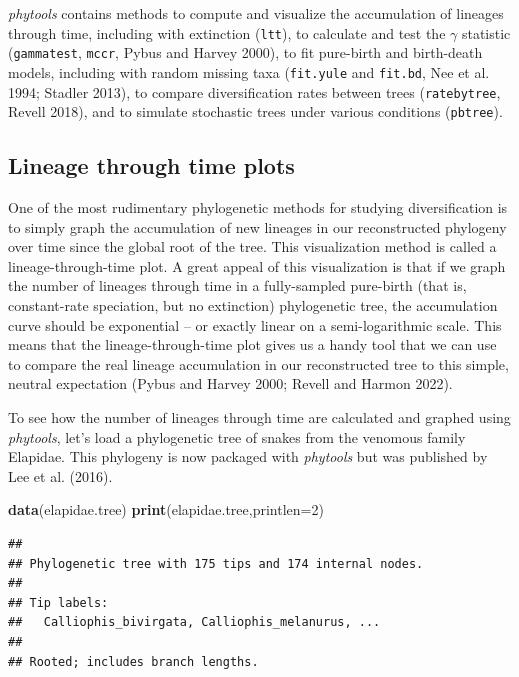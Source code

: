 \documentclass[fleqn,10pt,lineno]{wlpeerj} %
\newenvironment{Shaded}{\begin{snugshade}}{\end{snugshade}}
\newcommand{\AttributeTok}[1]{\textcolor[rgb]{0.13,0.29,0.53}{#1}}
\newcommand{\DecValTok}[1]{\textcolor[rgb]{0.00,0.00,0.81}{#1}}
\newcommand{\FunctionTok}[1]{\textcolor[rgb]{0.13,0.29,0.53}{\textbf{#1}}}
\newcommand{\NormalTok}[1]{#1}
\begin{document}
\emph{phytools} contains methods to compute and visualize the accumulation of lineages through time, including with extinction (\texttt{ltt}), to calculate and test the \(\gamma\) statistic (\texttt{gammatest}, \texttt{mccr}, Pybus and Harvey 2000), to fit pure-birth and birth-death models, including with random missing taxa (\texttt{fit.yule} and \texttt{fit.bd}, Nee et al. 1994; Stadler 2013), to compare diversification rates between trees (\texttt{ratebytree}, Revell 2018), and to simulate stochastic trees under various conditions (\texttt{pbtree}).

\hypertarget{lineage-through-time-plots}{%
\subsection{Lineage through time plots}\label{lineage-through-time-plots}}

One of the most rudimentary phylogenetic methods for studying diversification is to simply graph the accumulation of new lineages in our reconstructed phylogeny over time since the global root of the tree. This visualization method is called a lineage-through-time plot. A great appeal of this visualization is that if we graph the number of lineages through time in a fully-sampled pure-birth (that is, constant-rate speciation, but no extinction) phylogenetic tree, the accumulation curve should be exponential -- or exactly linear on a semi-logarithmic scale. This means that the lineage-through-time plot gives us a handy tool that we can use to compare the real lineage accumulation in our reconstructed tree to this simple, neutral expectation (Pybus and Harvey 2000; Revell and Harmon 2022).

To see how the number of lineages through time are calculated and graphed using \emph{phytools}, let's load a phylogenetic tree of snakes from the venomous family Elapidae. This phylogeny is now packaged with \emph{phytools} but was published by Lee et al. (2016).

\begin{Shaded}
\begin{Highlighting}[]
\FunctionTok{data}\NormalTok{(elapidae.tree)}
\FunctionTok{print}\NormalTok{(elapidae.tree,}\AttributeTok{printlen=}\DecValTok{2}\NormalTok{)}
\end{Highlighting}
\end{Shaded}

\begin{verbatim}
## 
## Phylogenetic tree with 175 tips and 174 internal nodes.
## 
## Tip labels:
##   Calliophis_bivirgata, Calliophis_melanurus, ...
## 
## Rooted; includes branch lengths.
\end{verbatim}
\end{document}
